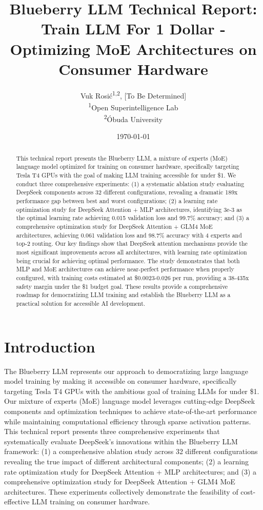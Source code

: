 \documentclass[11pt,a4paper]{article}
\title{Blueberry LLM Technical Report: Train LLM For 1 Dollar - Optimizing MoE Architectures on Consumer Hardware}
\author{
    Vuk Rosić\textsuperscript{1,2}, [To Be Determined] \\
    \textsuperscript{1}Open Superintelligence Lab \\
    \textsuperscript{2}Óbuda University
}
\date{\today}
\begin{document}
\maketitle

\begin{abstract}
This technical report presents the Blueberry LLM, a mixture of experts (MoE) language model optimized for training on consumer hardware, specifically targeting Tesla T4 GPUs with the goal of making LLM training accessible for under \$1. We conduct three comprehensive experiments: (1) a systematic ablation study evaluating DeepSeek components across 32 different configurations, revealing a dramatic 189x performance gap between best and worst configurations; (2) a learning rate optimization study for DeepSeek Attention + MLP architectures, identifying 3e-3 as the optimal learning rate achieving 0.015 validation loss and 99.7\% accuracy; and (3) a comprehensive optimization study for DeepSeek Attention + GLM4 MoE architectures, achieving 0.061 validation loss and 98.7\% accuracy with 4 experts and top-2 routing. Our key findings show that DeepSeek attention mechanisms provide the most significant improvements across all architectures, with learning rate optimization being crucial for achieving optimal performance. The study demonstrates that both MLP and MoE architectures can achieve near-perfect performance when properly configured, with training costs estimated at \$0.0023-0.026 per run, providing a 38-435x safety margin under the \$1 budget goal. These results provide a comprehensive roadmap for democratizing LLM training and establish the Blueberry LLM as a practical solution for accessible AI development.
\end{abstract}

\section{Introduction}

The Blueberry LLM represents our approach to democratizing large language model training by making it accessible on consumer hardware, specifically targeting Tesla T4 GPUs with the ambitious goal of training LLMs for under \$1. Our mixture of experts (MoE) language model leverages cutting-edge DeepSeek components and optimization techniques to achieve state-of-the-art performance while maintaining computational efficiency through sparse activation patterns. This technical report presents three comprehensive experiments that systematically evaluate DeepSeek's innovations within the Blueberry LLM framework: (1) a comprehensive ablation study across 32 different configurations revealing the true impact of different architectural components; (2) a learning rate optimization study for DeepSeek Attention + MLP architectures; and (3) a comprehensive optimization study for DeepSeek Attention + GLM4 MoE architectures. These experiments collectively demonstrate the feasibility of cost-effective LLM training on consumer hardware.
\end{document}
